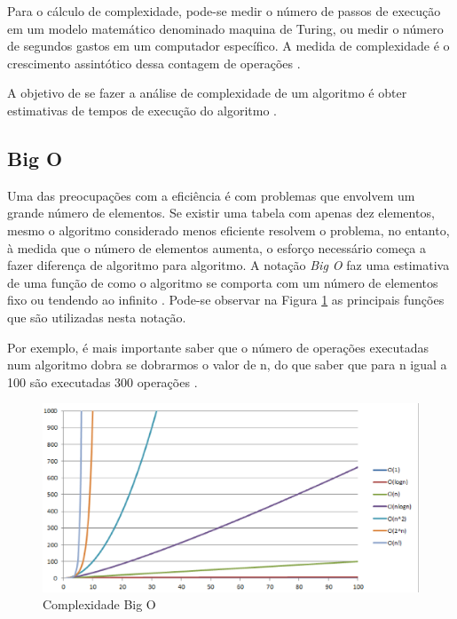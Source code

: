 \begin{apendicesenv}
Para o cálculo de complexidade, pode-se medir o número de passos de execução em um modelo matemático denominado maquina de Turing, ou medir o número de segundos gastos em um computador específico. A medida de complexidade é o crescimento assintótico dessa contagem de operações \cite{Junior:2014}.

A objetivo de se fazer a análise de complexidade de um algoritmo é obter estimativas de tempos de execução do algoritmo \cite{Junior:2014}.

\subsection{Big O}

Uma das preocupações com a eficiência é com problemas que envolvem um grande número de elementos. Se existir uma tabela com apenas dez elementos, mesmo o algoritmo considerado menos eficiente resolvem o problema, no entanto, à medida que o número de elementos aumenta, o esforço necessário começa a fazer diferença de algoritmo para algoritmo. A notação \textit{Big O} faz uma estimativa de uma função de como o algoritmo se comporta com um número de elementos fixo ou tendendo ao infinito \cite{Junior:2014}. Pode-se observar na Figura \ref{grafico_complexidade} as principais funções que são utilizadas nesta notação.

Por exemplo, é mais importante saber que o número de operações executadas num algoritmo dobra se dobrarmos o valor de n, do que saber que para n igual a 100 são executadas 300 operações \cite{Junior:2014}.

\begin{figure}[!h]
	\centering
	\includegraphics[scale=0.5]{figuras/apendices/grafico_complexidade.eps}
	\caption[Complexidade Big O]{Complexidade Big O}
	\label{grafico_complexidade}
\end{figure}


\end{apendicesenv}
